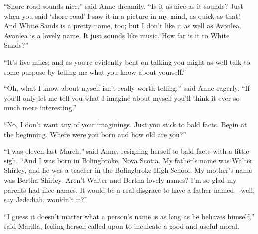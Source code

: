 \documentclass[a4paper]{article}
\begin{document}
``Shore road sounds nice,'' said Anne dreamily. ``Is it as nice as it sounds? Just when you said `shore road' I saw it in a picture in my mind, as quick as that! And White Sands is a pretty name, too; but I don't like it as well as Avonlea. Avonlea is a lovely name. It just sounds like music. How far is it to White Sands?''

``It's five miles; and as you're evidently bent on talking you might as well talk to some purpose by telling me what you know about yourself.''

``Oh, what I know about myself isn't really worth telling,'' said Anne eagerly. ``If you'll only let me tell you what I imagine about myself you'll think it ever so much more interesting.''

``No, I don't want any of your imaginings. Just you stick to bald facts. Begin at the beginning. Where were you born and how old are you?''

``I was eleven last March,'' said Anne, resigning herself to bald facts with a little sigh. ``And I was born in Bolingbroke, Nova Scotia. My father's name was Walter Shirley, and he was a teacher in the Bolingbroke High School. My mother's name was Bertha Shirley. Aren't Walter and Bertha lovely names? I'm so glad my parents had nice names. It would be a real disgrace to have a father named---well, say Jedediah, wouldn't it?''

``I guess it doesn't matter what a person's name is as long as he behaves himself,'' said Marilla, feeling herself called upon to inculcate a good and useful moral.
\end{document}
